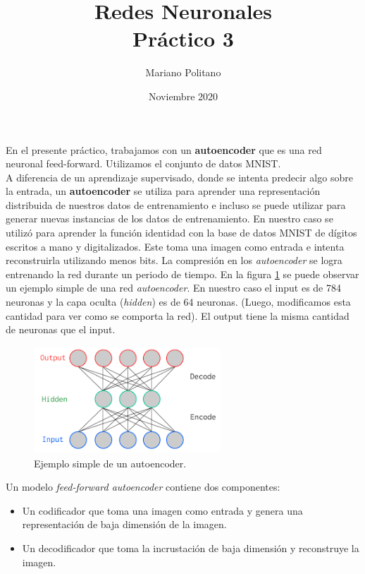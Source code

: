 \documentclass{article}
\title{Redes Neuronales \\
  \large Práctico 3 \\
  }
\author{Mariano Politano }
\date{Noviembre 2020}
\begin{document}
\maketitle




En el presente práctico, trabajamos con un  \textbf{autoencoder} que es una red neuronal feed-forward. Utilizamos el conjunto de datos MNIST.
\\

A diferencia de un aprendizaje supervisado, donde se intenta predecir algo sobre la entrada, un \textbf{autoencoder} se utiliza para aprender una representación distribuida de nuestros datos de entrenamiento e incluso se puede utilizar para generar nuevas instancias de los datos de entrenamiento.  
En nuestro caso se utilizó para aprender la función identidad con la base de datos MNIST de dígitos escritos a mano y digitalizados. Este toma una imagen como entrada e intenta reconstruirla utilizando menos bits. 
La compresión en los \textit{autoencoder} se logra entrenando la red durante un periodo de tiempo.
En la figura \ref{figAuto} se puede observar un ejemplo simple de una red \textit{autoencoder}. En nuestro caso el input es de 784 neuronas  y la capa oculta (\textit{hidden}) es de 64 neuronas. (Luego, modificamos esta cantidad para ver como se comporta la red). El output tiene la misma cantidad de neuronas que el input.
\begin{figure}[H]
\centering
\includegraphics[width=7cm, height=4cm]{AutoEncoder.png}
\caption{Ejemplo simple de un autoencoder.}
\label{figAuto}
\end{figure}
Un modelo \textit{feed-forward autoencoder} contiene dos componentes:

\begin{itemize}
\item Un codificador que toma una imagen como entrada y genera una representación de baja dimensión de la imagen.
\item Un decodificador que toma la incrustación de baja dimensión y reconstruye la imagen. 
\end{itemize}
\end{document}
